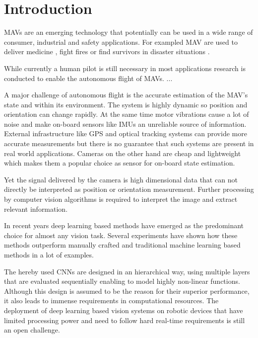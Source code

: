 \chapter{Introduction}
\label{sec:intro}

\acp{MAV} are an emerging technology that potentially can be used in a wide range of consumer, industrial and safety applications. For exampled \ac{MAV} are used to deliver medicine , fight fires  or find survivors in disaster situations .

While currently a human pilot is still necessary in most applications research is conducted to enable the autonomous flight of \acp{MAV}. ...

A major challenge of autonomous flight is the accurate estimation of the \ac{MAV}'s state and within its environment. The system is highly dynamic so position and orientation can change rapidly. At the same time motor vibrations cause a lot of noise and make on-board sensors like \acp{IMU} an unreliable source of information. External infrastructure like GPS and optical tracking systems can provide more accurate measurements but there is no guarantee that such systems are present in real world applications. Cameras on the other hand are cheap and lightweight which makes them a popular choice as sensor for on-board state estimation.

Yet the signal delivered by the camera is high dimensional data that can not directly be interpreted as position or orientation measurement. Further processing by computer vision algorithms is  required to interpret the image and extract relevant information.

In recent years deep learning based methods have emerged as the predominant choice for almost any vision task. Several experiments have shown how these methods outperform manually crafted and traditional machine learning based methods in a lot of examples.

The hereby used \acp{CNN} are designed in an hierarchical way, using multiple layers that are evaluated sequentially enabling to model highly non-linear functions. Although this design is assumed to be the reason for their superior performance, it also leads to immense requirements in computational resources. The deployment of deep learning based vision systems on robotic devices that have limited processing power and need to follow hard real-time requirements is still an open challenge. 

